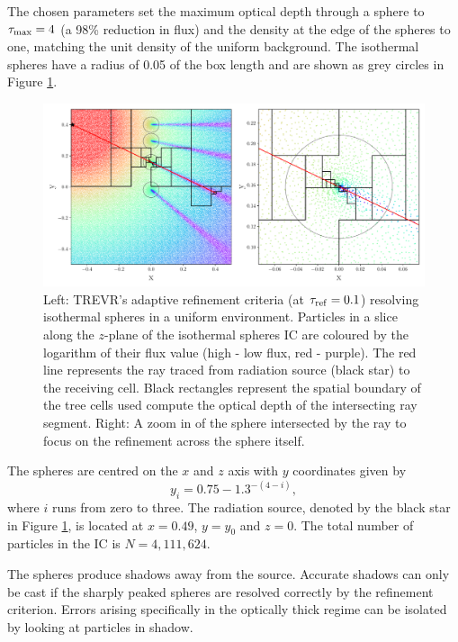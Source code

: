 \documentclass[fleq,usenatbib]{mnras}
\newcommand{\acro}{TREVR}
\newcommand{\tr}{\tau_{\rm ref}}
\begin{document}
{The chosen parameters set the maximum optical depth through a sphere to 
$\tau_{\rm max}=4$ (a 98\% reduction in flux) and the density at the edge of 
the spheres to one, matching the unit density of the uniform background. The 
isothermal spheres have a radius of 0.05 of the box length and are shown as 
grey circles in Figure \ref{fig:cellplot}.  
\begin{figure}
\includegraphics[width=1\linewidth]{Figures/cellplot.pdf}
\caption{Left: \acro{}'s adaptive refinement criteria (at $\tr =0.1$) 
resolving isothermal spheres in a uniform environment. Particles in a slice 
along the $z$-plane of the isothermal spheres IC are coloured by the logarithm 
of their flux value (high - low flux, red - purple). The red line represents 
the ray traced from radiation source (black star) to the receiving cell. Black 
rectangles represent the spatial boundary of the tree cells used compute the 
optical depth of the intersecting ray segment. Right: A zoom in of the sphere 
intersected by the ray to focus on the refinement across the sphere itself.}
\label{fig:cellplot}
\end{figure}
The spheres are centred on the $x$ and $z$ axis with $y$ coordinates given by
\begin{equation}
y_i = 0.75 - 1.3^{-(4-i)},
\end{equation}
where $i$ runs from zero to three. The radiation source, denoted by the black 
star in Figure \ref{fig:cellplot}, is located at $x=0.49$, $y=y_0$ and $z=0$. 
The total number of particles in the IC is $N=4,111,624$.

The spheres produce shadows away from the source. Accurate shadows can only be 
cast if the sharply peaked spheres are resolved correctly by the refinement 
criterion. Errors arising  specifically in the optically thick regime can be 
isolated by looking at particles in shadow.

}
\end{document}
